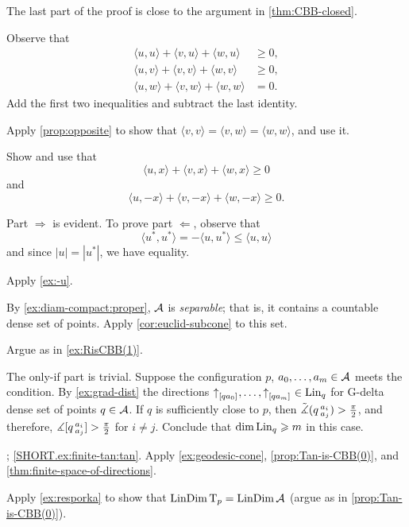 The last part of the proof is close to the argument in \ref{thm:CBB-closed}.

Observe that
\begin{align*}
\langle u,u\rangle+\langle v,u\rangle+\langle w,u\rangle &\ge 0,
\\
\langle u,v\rangle+\langle v,v\rangle+\langle w,v\rangle &\ge 0,
\\
\langle u,w\rangle+\langle v,w\rangle+\langle w,w\rangle &= 0.
\end{align*}
Add the first two inequalities and subtract the last identity.

Apply \ref{prop:opposite} to show that 
$\langle v,v\rangle =\langle v,w\rangle=\langle w,w\rangle$,
and use it.

 Show and use that
\[\langle u,x\rangle +\langle v,x\rangle +\langle w,x\rangle \ge 0\]
and
\[\langle u,-x\rangle +\langle v,-x\rangle +\langle w,-x\rangle \ge 0.\]

 Part $\Rightarrow$ is evident.
To prove part $\Leftarrow$, observe that 
\[\langle u^*,u^*\rangle =-\langle u,u^*\rangle\le \langle u,u\rangle\]
and since $|u|=|u^*|$, we have equality.

Apply \ref{ex:-u}.

By \ref{ex:diam-compact:proper}, $\mathcal{A}$ is \emph{separable}; that is, it contains a countable dense set of points.
Apply \ref{cor:euclid-subcone} to this set.

 Argue as in \ref{ex:RisCBB(1)}.

 The only-if part is trivial.
Suppose the configuration $p$, $a_0,\dots, a_{m}\in \mathcal{A}$ meets the condition.
By \ref{ex:grad-dist} the directions ${\uparrow}_{[{q}{a_0}]_{{}}},\dots,{\uparrow}_{[{q}{a_m}]_{{}}}\in \mathop{\rm Lin}\nolimits_q$ for G-delta dense set of points $q\in \mathcal{A}$.
If $q$ is sufficiently close to $p$, then $\tilde\measuredangle(q\,{}^{a_i}_{a_j})>\tfrac\pi2$,
and therefore, $\measuredangle[q\,{}^{a_i}_{a_j}]>\tfrac\pi2$ for $i\ne j$.
Conclude that $\operatorname{\rm dim}\nolimits\mathop{\rm Lin}\nolimits_q\geqslant m$ in this case.

\parbf{\ref{ex:finite-tan}}; 
\ref{SHORT.ex:finite-tan:tan}. Apply \ref{ex:geodesic-cone}, \ref{prop:Tan-is-CBB(0)}, and \ref{thm:finite-space-of-directions}.

Apply \ref{ex:resporka} to show that $\mathop{\rm LinDim}\nolimits\mathrm{T}_p=\mathop{\rm LinDim}\nolimits\mathcal{A}$ (argue as in \ref{prop:Tan-is-CBB(0)}).

